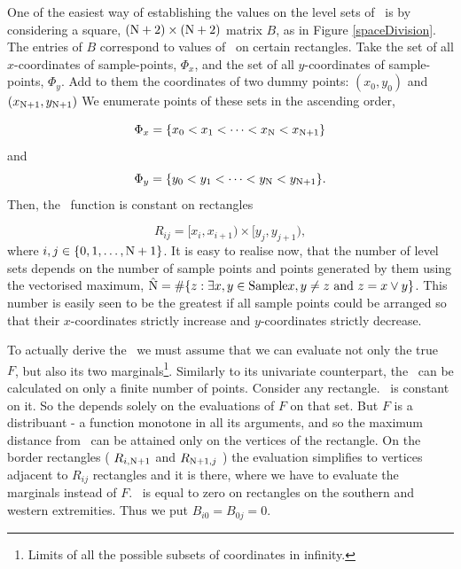 One of the easiest way of establishing the values on the level sets of \Fecdf\, is by considering a square, $(\mathrm{N}+2)\times(\mathrm{N}+2)$ matrix $B$, as in Figure \ref{spaceDivision}. The entries of $B$ correspond to values of \Fecdf\, on certain rectangles. Take the set of all $x$-coordinates of sample-points, $\Phi_x$, and the set of all $y$-coordinates of sample-points, $\Phi_y$. Add to them the coordinates of two dummy points: $(x_0, y_0)$ and $(x_{\mathrm{N}+1}, y_{\mathrm{N}+1})$ We enumerate points of these sets in the ascending order, 

	$$\Phi_x = \{ x_0 < x_1 < \dots <x_{\mathrm{N}} < x_{\mathrm{N}+1} \}$$ 
and 
	$$\Phi_y = \{ y_0 < y_1 < \dots <y_{\mathrm{N}} < y_{\mathrm{N}+1} \}.$$
Then, the \Fecdf\, function is constant on rectangles 

$$R_{ij} = [x_i, x_{i+1})\times[y_j, y_{j+1}),$$ 
where $i,j \in \{0, 1, \dots, \mathrm{N}+1 \}$. It is easy to realise now, that the number of level sets depends on the number of sample points and points generated by them using the vectorised maximum, $\hat{\mathrm{N}} = \# \{ z : \exists x,y \in \text{Sample} x,y \not=z \text{ and } z = x \vee y \}$. This number is easily seen to be the greatest if all sample points could be arranged so that their $x$-coordinates strictly increase and $y$-coordinates strictly decrease.  

To actually derive the \KS\, we must assume that we can evaluate not only the true \cdf\, $F$, but also its two marginals\footnote{Limits of all the possible subsets of coordinates in infinity.}. Similarly to its univariate counterpart, the \KS\, can be calculated on only a finite number of points. Consider any rectangle. \Fecdf\, is constant on it. So the \KS depends solely on the evaluations of $F$ on that set. But $F$ is a distribuant - a function monotone in all its arguments, and so the maximum distance from \Fecdf\, can be attained only on the vertices of the rectangle. On the border rectangles ( $R_{i,\mathrm{N}+1}$ and $R_{\mathrm{N}+1,j}$ ) the evaluation simplifies to vertices adjacent to $R_{ij}$ rectangles and it is there, where we have to evaluate the marginals instead of $F$. \Fecdf\, is equal to zero on rectangles on the southern and western extremities. Thus we put $B_{i0} = B_{0j} = 0$. 

